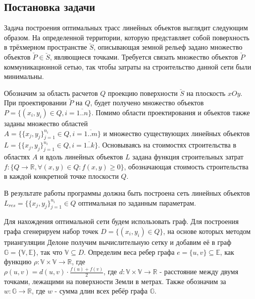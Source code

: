 \newpage

\subsection*{\Large{Постановка задачи}}

Задача построения оптимальных трасс линейных объектов выглядит следующим образом. На определенной территории, которую представляет собой поверхность в трёхмерном пространстве $\breve{S}$, описывающая земной рельеф задано множество объектов $\check{P} \in \breve{S}$, являющиеся точками. Требуется связать множество объектов $\check{P}$ коммуникационной сетью, так чтобы затраты на строительство данной сети были минимальны.
\par
Обозначим за область расчетов $Q$ проекцию поверхности $\breve{S}$ на плоскость $xOy$. 
При проектировании  $\check{P}$ на $Q$, будет получено множество объектов \mbox{$P = \{(x_i, y_i) \in Q , i=\overline{1..n}\}$}. Помимо области проектирования и объектов также заданы множество областей \\ \mbox{$A = \{\{x_{j},y_{j}\}_{j=1}^{n_i} \in Q, i=\overline{1..m}\}$} и множество существующих линейных объектов \\ \mbox{$L = \{\{x_{j},y_{j}\}_{j=1}^{n_i} \in Q, i=\overline{1..k}\}$}. 
Основываясь на стоимостях строительства в областях $A$ и вдоль линейных объектов $L$ задана функция строительных затрат \\ \mbox{$f: \{Q \rightarrow \mathbb{R}, \forall(x, y) \in Q: f(x, y) \ge 0\}$}, обозначающая стоимость строительства в каждой конкретной точке плоскости $Q$.
\par
В результате работы программы должна быть построена сеть линейных объектов \\
$L_{res} = \{\{x_{j},y_{j}\}_{j=1}^{n_i} \in Q$ оптимальная по заданным параметрам.
\par
Для нахождения оптимальной сети будем использовать граф. 
Для построения графа сгенерируем набор точек $D  = \{(x_i, y_i) \in Q\}$, на основе которых методом триангуляции Делоне получим вычислительную сетку и добавим её в граф $\mathbb{G} = \{\mathbb{V}, \mathbb{E}\}$, так что $\mathbb{V} \subseteq D$. Определим веса ребер графа $e = \{u,v\} \subseteq \mathbb{E}$, как функцию $\rho: \mathbb{V} \times \mathbb{V} \rightarrow \mathbb{R}$, где \\ $\rho(u, v) = d(u, v) \cdot \frac{f(u) + f(v)}{2} $, где $d:  \mathbb{V} \times \mathbb{V} \rightarrow \mathbb{R}$ - расстояние между двумя точками, лежащими на поверхности Земли в  метрах. Также обозначим за $w: \mathbb{G} \rightarrow \mathbb{R}$, где $w$ - сумма длин всех ребёр графа $\mathbb{G}$.

